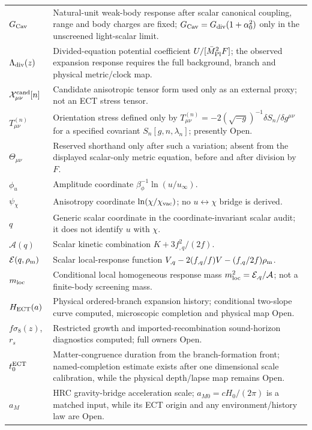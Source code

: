 \documentclass[11pt,a4paper]{article}
\begin{document}
\begin{longtable}{@{}p{2.6cm}p{12.6cm}@{}}
$G_{\rm Cav}$ & Natural-unit weak-body response after scalar canonical coupling, range and body charges are fixed; $G_{\rm Cav}=G_{\rm div}(1+\alpha_0^2)$ only in the unscreened light-scalar limit. \\
$\Lambda_{\rm div}(z)$ & Divided-equation potential coefficient $U/[\bar M_{\rm Pl}^2F]$; the observed expansion response requires the full background, branch and physical metric/clock map. \\
$\mathcal X^{\rm cand}_{\mu\nu}[n]$ & Candidate anisotropic tensor form used only as an external proxy; not an ECT stress tensor. \\
$T^{(n)}_{\mu\nu}$ & Orientation stress defined only by $T^{(n)}_{\mu\nu}=-2(\sqrt{-g})^{-1}\delta S_n/\delta g^{\mu\nu}$ for a specified covariant $S_n[g,n,\lambda_n]$; presently Open. \\
$\Theta_{\mu\nu}$ & Reserved shorthand only after such a variation; absent from the displayed scalar-only metric equation, before and after division by $F$. \\
$\phi_u$ & Amplitude coordinate $\beta_\phi^{-1}\ln(u/u_\infty)$. \\
$\psi_\chi$ & Anisotropy coordinate $\ln(\chi/\chi_{\rm vac})$; no $u\leftrightarrow\chi$ bridge is derived. \\
$q$ & Generic scalar coordinate in the coordinate-invariant scalar audit; it does not identify $u$ with $\chi$. \\
$\mathcal A(q)$ & Scalar kinetic combination $K+3f_{,q}^2/(2f)$. \\
$\mathcal E(q,\rho_{\rm m})$ & Scalar local-response function $V_{,q}-2(f_{,q}/f)V-(f_{,q}/2f)\rho_{\rm m}$. \\
$m_{\rm loc}$ & Conditional local homogeneous response mass $m_{\rm loc}^2=\mathcal E_{,q}/\mathcal A$; not a finite-body screening mass. \\
$H_{\rm ECT}(a)$ & Physical ordered-branch expansion history; conditional two-slope curve computed, microscopic completion and physical map Open. \\
$f\sigma_8(z)$, $r_s$ & Restricted growth and imported-recombination sound-horizon diagnostics computed; full owners Open. \\
$t_0^{\rm ECT}$ & Matter-congruence duration from the branch-formation front; named-completion estimate exists after one dimensional scale calibration, while the physical depth/lapse map remains Open. \\
$a_M$ & HRC gravity-bridge acceleration scale; $a_{M0}=cH_0/(2\pi)$ is a matched input, while its ECT origin and any environment/history law are Open. \\

\end{longtable}
\end{document}
